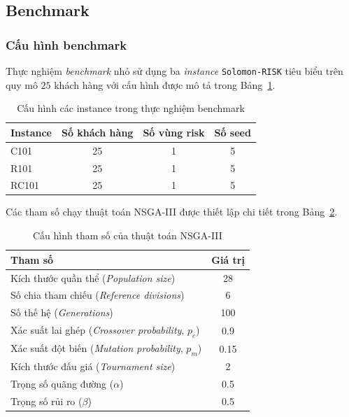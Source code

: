 \documentclass{article}
\begin{document}
\subsection{Benchmark}

\subsubsection{Cấu hình benchmark}

Thực nghiệm \textit{benchmark} nhỏ sử dụng ba \textit{instance} \texttt{Solomon-RISK} tiêu biểu trên quy mô $25$ khách hàng với cấu hình được mô tả trong Bảng~\ref{tab:nsga3_instances}.

\begin{table}[htbp]
    \centering
    \caption{Cấu hình các instance trong thực nghiệm benchmark}
    \label{tab:nsga3_instances}
    \begin{tabular}{|l|c|c|c|}
        \hline
        \textbf{Instance} & \textbf{Số khách hàng} & \textbf{Số vùng risk} & \textbf{Số seed} \\ \hline
        C101 & 25 & 1 & 5 \\ \hline
        R101 & 25 & 1 & 5 \\ \hline
        RC101 & 25 & 1 & 5 \\ \hline
    \end{tabular}
\end{table}

Các tham số chạy thuật toán NSGA-III được thiết lập chi tiết trong Bảng~\ref{tab:nsga3_params}.

\begin{table}[htbp]
    \centering
    \caption{Cấu hình tham số của thuật toán NSGA-III}
    \label{tab:nsga3_params}
    \begin{tabular}{|l|c|}
        \hline
        \textbf{Tham số} & \textbf{Giá trị} \\ \hline
        Kích thước quần thể (\textit{Population size}) & 28 \\ \hline
        Số chia tham chiếu (\textit{Reference divisions}) & 6 \\ \hline
        Số thế hệ (\textit{Generations}) & 100 \\ \hline
        Xác suất lai ghép (\textit{Crossover probability}, $p_c$) & 0.9 \\ \hline
        Xác suất đột biến (\textit{Mutation probability}, $p_m$) & 0.15 \\ \hline
        Kích thước đấu giá (\textit{Tournament size}) & 2 \\ \hline
        Trọng số quãng đường ($\alpha$) & 0.5 \\ \hline
        Trọng số rủi ro ($\beta$) & 0.5 \\ \hline
    \end{tabular}
\end{table}
\end{document}
